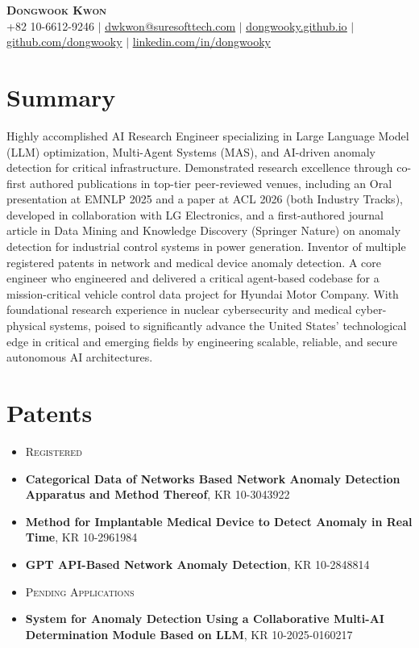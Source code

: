 \documentclass[letterpaper,11pt]{article}
\newcommand{\resumeSubLabel}[1]{\item {\scshape\small #1}\vspace{-3pt}}
\newcommand{\resumeSubHeadingListStart}{\begin{itemize}[leftmargin=0.15in, label={}]}
\newcommand{\resumeSubHeadingListEnd}{\end{itemize}}
\begin{document}
\begin{center}
    \textbf{\Huge \scshape Dongwook Kwon} \\ \vspace{1pt}
    \small +82 10-6612-9246 $|$
    \href{mailto:dwkwon@suresofttech.com}{\underline{dwkwon@suresofttech.com}} $|$
    \href{https://dongwooky.github.io}{\underline{dongwooky.github.io}} $|$
    \href{https://github.com/dongwooky}{\underline{github.com/dongwooky}} $|$
    \href{https://linkedin.com/in/dongwooky}{\underline{linkedin.com/in/dongwooky}}
\end{center}


\section{Summary}
{\small Highly accomplished AI Research Engineer specializing in Large Language Model (LLM) optimization, Multi-Agent Systems (MAS), and AI-driven anomaly detection for critical infrastructure. Demonstrated research excellence through co-first authored publications in top-tier peer-reviewed venues, including an Oral presentation at EMNLP 2025 and a paper at ACL 2026 (both Industry Tracks), developed in collaboration with LG Electronics, and a first-authored journal article in Data Mining and Knowledge Discovery (Springer Nature) on anomaly detection for industrial control systems in power generation. Inventor of multiple registered patents in network and medical device anomaly detection. A core engineer who engineered and delivered a critical agent-based codebase for a mission-critical vehicle control data project for Hyundai Motor Company. With foundational research experience in nuclear cybersecurity and medical cyber-physical systems, poised to significantly advance the United States' technological edge in critical and emerging fields by engineering scalable, reliable, and secure autonomous AI architectures.}
\vspace{2pt}


\section{Patents}
  \resumeSubHeadingListStart
    \resumeSubLabel{Registered}
    \item\small{\textbf{Categorical Data of Networks Based Network Anomaly Detection Apparatus and Method Thereof}, KR 10-3043922}
    \item\small{\textbf{Method for Implantable Medical Device to Detect Anomaly in Real Time}, KR 10-2961984}
    \item\small{\textbf{GPT API-Based Network Anomaly Detection}, KR 10-2848814}
    \vspace{2pt}
    \resumeSubLabel{Pending Applications}
    \item\small{\textbf{System for Anomaly Detection Using a Collaborative Multi-AI Determination Module Based on LLM}, KR 10-2025-0160217}
  \resumeSubHeadingListEnd
\end{document}

